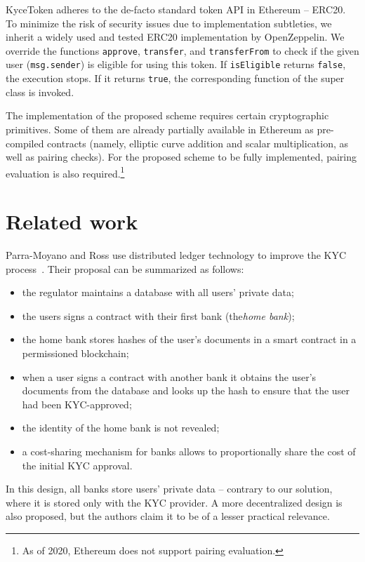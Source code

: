 KyceToken adheres to the de-facto standard token API in Ethereum -- ERC20.
To minimize the risk of security issues due to implementation subtleties, we inherit a widely used and tested ERC20 implementation by OpenZeppelin.
We override the functions \texttt{approve}, \texttt{transfer}, and \texttt{transferFrom} to check if the given user (\texttt{msg.sender}) is eligible for using this token.
If \texttt{isEligible} returns \texttt{false}, the execution stops.
If it returns \texttt{true}, the corresponding function of the super class is invoked.

The implementation of the proposed scheme requires certain cryptographic primitives.
Some of them are already partially available in Ethereum as pre-compiled contracts (namely, elliptic curve addition and scalar multiplication, as well as pairing checks).
For the proposed scheme to be fully implemented, pairing evaluation is also required.\footnote{As of 2020, Ethereum does not support pairing evaluation.}



\section{Related work}

Parra-Moyano and Ross use distributed ledger technology to improve the KYC process~\cite{Moyano2017}.
Their proposal can be summarized as follows:
\begin{itemize}
	\item the regulator maintains a database with all users' private data;
	\item the users signs a contract with their first bank (the\textit{home bank});
	\item the home bank stores hashes of the user's documents in a smart contract in a permissioned blockchain;
	\item when a user signs a contract with another bank it obtains the user's documents from the database and looks up the hash to ensure that the user had been KYC-approved;
	\item the identity of the home bank is not revealed;
	\item a cost-sharing mechanism for banks allows to proportionally share the cost of the initial KYC approval.
\end{itemize}
In this design, all banks store users' private data -- contrary to our solution, where it is stored only with the KYC provider.
A more decentralized design is also proposed, but the authors claim it to be of a lesser practical relevance.

